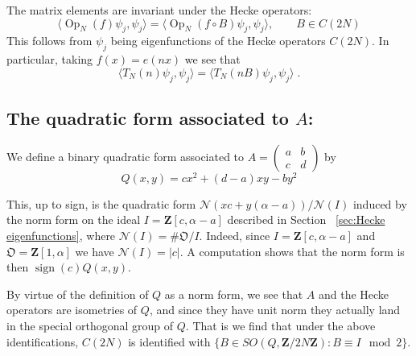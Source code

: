 \documentclass[12pt]{amsart}
\theoremstyle{plain}
\newcommand{\Z}{{\mathbf Z}}
\newcommand{\ideal}{I}
\newcommand{\unit}{\alpha}
\newcommand{\mnorm}{ {\mathcal N}} %
\newcommand{\TN}{T_N}  %
\newcommand{\OPN}{\operatorname{Op}_N}
\newcommand{\OF}{\mathfrak{O}}
\newcommand{\torusN}{C(2N)}%
\newcommand{\sign}{\operatorname{sign}}
\renewcommand{\^}{\widehat}
\begin{document}
The matrix elements are invariant under the Hecke operators:
$$
\langle\OPN(f)\psi_j,\psi_j \rangle  = 
\langle\OPN(f\circ B)\psi_j,\psi_j \rangle,\qquad B\in \torusN
$$
This follows from $\psi_j$ being eigenfunctions of the Hecke operators
$\torusN$. 
In particular, taking $f(x) = e(nx)$ we see that 
\begin{equation}\label{Hecke invariance}
\langle\TN(n)\psi_j,\psi_j \rangle = \langle\TN(nB)\psi_j,\psi_j
\rangle \;. 
\end{equation}


\subsection{The quadratic form associated to $A$: } 
We define a binary quadratic form associated to
$A=\begin{pmatrix}a&b\\c&d\end{pmatrix}$ by  
$$
Q(x,y) =cx^2+(d-a)xy-by^2
$$

This, up to sign, is the quadratic form 
$\mnorm(x c+y(\unit -a))/\mnorm(\ideal)$ induced by the norm form on the
ideal $\ideal = \Z[c,\unit-a]$ 
described in Section ~\ref{sec:Hecke eigenfunctions},    
where $\mnorm(I) = \#\OF/\ideal$. Indeed, since 
$\ideal=\Z[c,\unit-a]$ and $\OF=\Z[1,\unit]$ we have
$\mnorm(\ideal)=|c|$. A computation shows that the norm form is
then $\sign(c)Q(x,y)$. 

 By virtue of the  definition of $Q$ as a norm form, we see that $A$ and the
Hecke operators are isometries of $Q$, and since they have unit norm
they actually land in the special orthogonal group of $Q$.  That is we
find that under the above identifications, $\torusN $ is identified
with $\{B\in SO(Q,\Z/2N\Z): B\equiv I\mod 2 \}$. 
\end{document}
